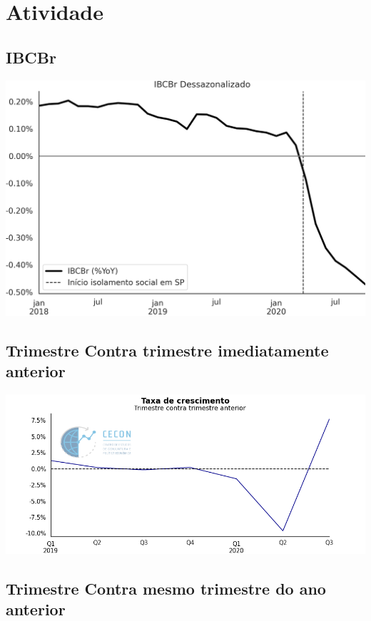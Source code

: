 \documentclass{SelfArx}
\begin{document}
\section*{Atividade}
\label{sec:org04af17d}

\subsection*{IBCBr}
\label{sec:orgdabb189}

\begin{center}
\includegraphics[width=.9\linewidth]{./figs/Antecedente/IBCBr.png}
\end{center}


\subsection*{Trimestre Contra trimestre imediatamente anterior}
\label{sec:orge551fa3}

\begin{center}
\includegraphics[width=.9\linewidth]{./figs/PIB/PIB.png}
\end{center}

\subsection*{Trimestre Contra mesmo trimestre do ano anterior}
\label{sec:orgf9fc87a}
\end{document}
